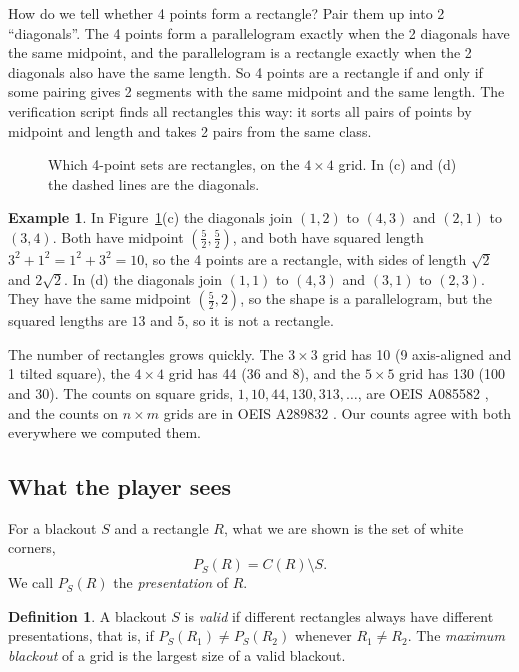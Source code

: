 \documentclass[11pt]{article}
\theoremstyle{definition}
\newtheorem{definition}[theorem]{Definition}
\newtheorem{example}[theorem]{Example}
\theoremstyle{remark}
\newcommand{\pres}{P_S}
\begin{document}
How do we tell whether 4 points form a rectangle? Pair them up into 2 ``diagonals''. The 4
points form a parallelogram exactly when the 2 diagonals have the same midpoint, and the
parallelogram is a rectangle exactly when the 2 diagonals also have the same length. So 4
points are a rectangle if and only if some pairing gives 2 segments with the same midpoint and
the same length. The verification script finds all rectangles this way: it sorts all pairs of
points by midpoint and length and takes 2 pairs from the same class.

\begin{figure}[htbp]
\centering

\caption{Which 4-point sets are rectangles, on the $4\times4$ grid. In (c) and (d) the dashed
lines are the diagonals.}
\label{fig:rects}
\end{figure}

\begin{example}
In Figure~\ref{fig:rects}(c) the diagonals join $(1,2)$ to $(4,3)$ and $(2,1)$ to $(3,4)$.
Both have midpoint $(\frac52,\frac52)$, and both have squared length $3^2+1^2=1^2+3^2=10$, so
the 4 points are a rectangle, with sides of length $\sqrt2$ and $2\sqrt2$. In (d) the diagonals
join $(1,1)$ to $(4,3)$ and $(3,1)$ to $(2,3)$. They have the same midpoint $(\frac52,2)$, so
the shape is a parallelogram, but the squared lengths are $13$ and $5$, so it is not a rectangle.
\end{example}

The number of rectangles grows quickly. The $3\times3$ grid has 10 (9 axis-aligned and 1 tilted
square), the $4\times4$ grid has 44 (36 and 8), and the $5\times5$ grid has 130 (100 and 30).
The counts on square grids, $1,10,44,130,313,\ldots$, are OEIS A085582 \cite{oeisA085582}, and
the counts on $n\times m$ grids are in OEIS A289832 \cite{oeisA289832}. Our counts agree with
both everywhere we computed them.

\subsection{What the player sees}

For a blackout $S$ and a rectangle $R$, what we are shown is the set of white corners,
\[
\pres(R)=C(R)\setminus S .
\]
We call $\pres(R)$ the \emph{presentation} of $R$.

\begin{definition}
A blackout $S$ is \emph{valid} if different rectangles always have different presentations,
that is, if $\pres(R_1)\ne\pres(R_2)$ whenever $R_1\ne R_2$. The \emph{maximum blackout} of a
grid is the largest size of a valid blackout.
\end{definition}
\end{document}
